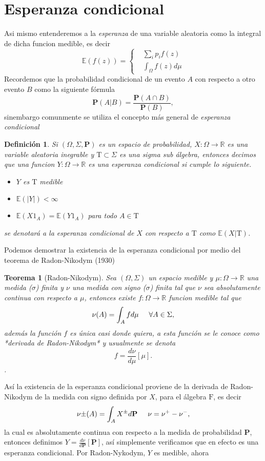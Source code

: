 \documentclass[letterpaper]{book}
\newtheorem{teorema}{Teorema}[section]
\newtheorem{def.}{Definici\'on}[section]
\newcommand{\prob}{\textbf{P}}
\newcommand{\esp}{\mathbb E}
\newcommand{\dem}{{\noindent \sc Demostraci\'on. }}
\newcommand{\re}{\ensuremath{\mathbb R }}
\begin{document}
\section{Esperanza condicional}
\label{sec:org5805293}
\noindent Asi mismo entenderemos a la \emph{esperanza} de una variable aleatoria como la integral de dicha funcion medible, es decir
\begin{equation}
    \esp(f(z))=
    \begin{cases}
        & \sum_{i} p_i f(z)\\
        & \int_{\Omega}f(z)d\mu
    \end{cases}
\end{equation}
Recordemos que la probabilidad condicional de un evento \(A\) con respecto a otro evento \(B\) como la siguiente fórmula
\[
    \prob(A|B)=\frac{\prob(A\cap B)}{\prob(B)},
\]
\noindent sinembargo comunmente se utiliza el concepto más general de \emph{esperanza condicional}
\begin{def.}
    Si \((\Omega,\Sigma,\prob)\) es un espacio de probabilidad, \(X:\Omega\rightarrow\re\) es una variable aleatoria inegrable y \(\mathrm{T} \subset\Sigma\) es una sigma sub álgebra, entonces decimos que una funcion \(Y:\Omega\rightarrow\re\) es una \emph{esperanza} condicional si cumple lo siguiente.
\begin{itemize}
\item \(Y\) es \(\mathrm{T}\) medible
\item \(\esp(|Y|)<\infty\)
\item \(\esp(X 1_A)=\esp(Y1_A)\) para todo \(A\in\mathrm{T}\)
\end{itemize}
se denotará a la esperanza condicional de \(X\) con respecto a \(\mathrm{T}\) como \(\esp(X|\mathrm{T})\).
\end{def.}
\noindent\dem Podemos demostrar la existencia de la esperanza condicional por medio del teorema de Radon-Nikodym (1930)
\begin{teorema}[Radon-Nikodym]
    Sea $(\Omega,\Sigma)$ un espacio medible y $\mu:\Omega\rightarrow\re$ una medida ($\sigma$) finita y $\nu$ una medida con signo ($\sigma$) finita tal que $\nu$ sea absolutamente continua con respecto a $\mu$, entonces existe $f:\Omega\rightarrow\re$ funcion medible tal que
\begin{equation}
    \nu(A)=\int_{A} f d\mu \hspace{0.5cm}\forall A\in\Sigma,
\end{equation}
además la función $f$ es única casi donde quiera, a esta función se le conoce como *derivada de Radon-Nikodym* y usualmente se denota
\[
    f=\frac{d\nu}{d\mu}[\mu].
\].
\end{teorema}
\noindent Así la existencia de la esperanza condicional proviene de la derivada de Radon-Nikodym de la medida con signo definida por \(X\), para el álgebra \(\mathrm{F}\), es decir
\[
    \nu{\pm}(A)=\int_{A}X^{\pm}d\prob\hspace{0.5cm}\nu=\nu^{+}-\nu^{-},
\]
\noindent la cual es absolutamente continua con respecto a la medida de probabilidad \textbf{P}, entonces definimos \(Y=\frac{d\nu}{d\prob}[\prob]\), así simplemente verificamos que en efecto es una esperanza condicional. Por Radon-Nykodym, \(Y\) es medible, ahora
\end{document}
